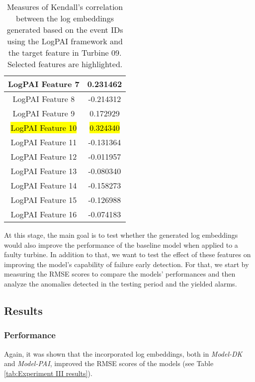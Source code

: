 \begin{table}[H]
{\begin{tabular}{|c|c|}
        \hline
        \multicolumn{1}{|m{0.25\textwidth}|}{LogPAI Feature 7} & 0.231462\\
        \hline
        \multicolumn{1}{|m{0.25\textwidth}|}{LogPAI Feature 8} & -0.214312\\
        \hline
        \multicolumn{1}{|m{0.25\textwidth}|}{LogPAI Feature 9} & 0.172929\\
        \hline
        \multicolumn{1}{|m{0.25\textwidth}|}{\hl{LogPAI Feature 10}} & \hl{0.324340}\\
        \hline
        \multicolumn{1}{|m{0.25\textwidth}|}{LogPAI Feature 11} & -0.131364\\
        \hline
        \multicolumn{1}{|m{0.25\textwidth}|}{LogPAI Feature 12} & -0.011957\\
        \hline
        \multicolumn{1}{|m{0.25\textwidth}|}{LogPAI Feature 13} & -0.080340\\
        \hline
        \multicolumn{1}{|m{0.25\textwidth}|}{LogPAI Feature 14} & -0.158273\\
        \hline
        \multicolumn{1}{|m{0.25\textwidth}|}{LogPAI Feature 15}& -0.126988\\
        \hline
        \multicolumn{1}{|m{0.25\textwidth}|}{LogPAI Feature 16} & -0.074183\\
        \hline
    \end{tabular}
    \caption{Measures of Kendall's correlation between the log embeddings generated based on the event IDs using the LogPAI framework and the target feature in Turbine 09. Selected features are highlighted.}
    \label{tab:expIII:logpai-feats}
    }
    \end{table}

At this stage, the main goal is to test whether the generated log embeddings would also improve the performance of the baseline model when applied to a 
faulty turbine. In addition to that, we want to test the effect of these features on improving the model's capability of failure early detection.
For that, we start by measuring the RMSE scores to compare the models' performances and then analyze the anomalies detected in the testing period 
and the yielded alarms.

\subsection{Results}
\subsubsection{Performance}
Again, it was shown that the incorporated log embeddings, both in \emph{Model-DK} and \emph{Model-PAI}, improved the RMSE scores of the models (see Table \ref{tab:Experiment III results}). 

